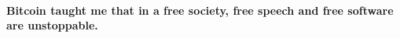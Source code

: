 \paragraph{Bitcoin taught me that in a free society, free speech and free software
are unstoppable.}

%
%
%
%
%
%
%
